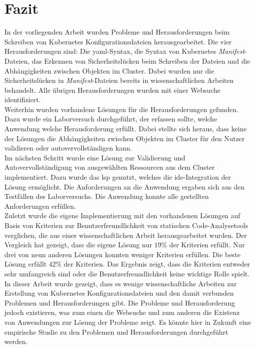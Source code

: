 \chapter{Fazit}\label{ch:conclusion}
In der vorliegenden Arbeit wurden Probleme und Herausforderungen beim Schreiben
von Kubernetes Konfigurationsdateien herausgearbeitet.
Die vier Herausforderungen sind: Die \ac{yaml}-Syntax, die Syntax von Kubernetes \textit{Manifest}-Dateien,
das Erkennen von Sicherheitslücken beim Schreiben der Dateien und die Abhängigkeiten zwischen Objekten im Cluster.
Dabei wurden nur die Sicherheitslücken in \textit{Manifest}-Dateien bereits in wissenschaftlichen Arbeiten behandelt.
Alle übrigen Herausforderungen wurden mit einer Websuche identifiziert.
\\
Weiterhin wurden vorhandene Lösungen für die Herausforderungen gefunden.
Dazu wurde ein Laborversuch durchgeführt, der erfassen sollte, welche Anwendung welche Herausforderung erfüllt.
Dabei stellte sich heraus, dass keine der Lösungen die Abhängigkeiten zwischen Objekten im Cluster
für den Nutzer validieren oder autovervollständigen kann.
\\
Im nächsten Schritt wurde eine Lösung zur Validierung und Autovervollständigung von ausgewählten
Ressourcen aus dem Cluster implementiert. Dazu wurde das \ac{lsp} genutzt, welches die
\ac{ide}-Integration der Lösung ermöglicht.
Die Anforderungen an die Anwendung ergaben sich aus den Testfällen des Laborversuchs.
Die Anwendung konnte alle gestellten Anforderungen erfüllen.
\\
Zuletzt wurde die eigene Implementierung mit den vorhandenen Lösungen auf Basis
von Kriterien zur Benutzerfreundlichkeit von statischen Code-Analysetools verglichen, die aus einer wissenschaftlichen Arbeit herausgearbeitet
wurden. Der Vergleich hat gezeigt, dass die eigene Lösung nur $19\%$ der Kriterien erfüllt.
Nur drei von neun anderen Lösungen konnten weniger Kriterien erfüllen.
Die beste Lösung erfüllt $42\%$ der Kriterien.
Das Ergebnis zeigt, dass die Kriterien entweder sehr umfangreich sind oder die Benutzerfreundlichkeit
keine wichtige Rolle spielt.
\\
In dieser Arbeit wurde gezeigt, dass es wenige wissenschaftliche Arbeiten zur Erstellung von
Kubernetes Konfigurationsdateien und den damit verbunden Problemen und Herausforderungen gibt.
Die Probleme und Herausforderung jedoch existieren, was zum einen die Websuche und zum anderen die
Existenz von Anwendungen zur Lösung der Probleme zeigt. Es könnte hier in Zukunft eine
empirische Studie zu den Problemen und Herausforderungen durchgeführt werden.
